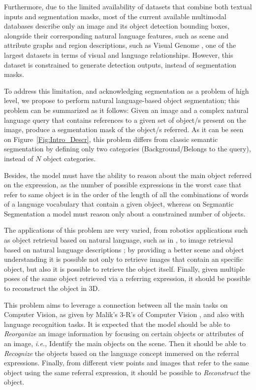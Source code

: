 Furthermore, due to the limited availability of datasets that combine both textual inputs and segmentation masks, most of the current available multimodal databases describe only an image and its object detection bounding boxes, alongside their corresponding natural language features, such as scene and attribute graphs and region descriptions, such as Visual Genome \cite{krishna_visual_2016}, one of the largest datasets in terms of visual and language relationships. However, this dataset is constrained to generate detection outputs, instead of segmentation masks.

To address this limitation, and acknowledging segmentation as a problem of high level, we propose to perform natural language-based object segmentation; this problem can be summarized as it follows: Given an image and a complex natural language query that contains references to a given set of object/s present on the image, produce a segmentation mask of the object/s referred. As it can be seen on Figure~\ref{Fig:Intro_Descr}, this problem differs from classic semantic segmentation by defining only two categories (Background/Belongs to the query), instead of $N$ object categories.

Besides, the model must have the ability to reason about the main object referred on the expression, as the number of possible expressions in the worst case that refer to same object is in the order of the length of all the combinations of words of a language vocabulary that contain a given object, whereas on Segmantic Segmentation a model must reason only about a constrained number of objects.

The applications of this problem are very varied, from robotics applications such as object retrieval based on natural language, such as in \cite{guadarrama_understanding_2016}, to image retrieval based on natural language descriptions \cite{schuster2015generating}; by providing a better scene and object understanding it is possible not only to retrieve images that contain an specific object, but also it is possible to retrieve the object itself. Finally, given multiple poses of the same object retrieved via a referring expression, it should be possible to reconstruct the object in 3D.

This problem aims to leverage a connection between all the main tasks on Computer Vision, as given by Malik's 3-R's of Computer Vision \cite{malik2016three}, and also with language recognition tasks. It is expected that the model should be able to \emph{Reorganize} an image information by focusing on certain objects or attributes of an image, \textit{i.e.,} Identify the main objects on the scene. Then it should be able to \emph{Recognize} the objects based on the language concept immersed on the referral expressions. Finally, from different view points and images that refer to the same object using the same referral expression, it should be possible to \emph{Reconstruct} the object.
